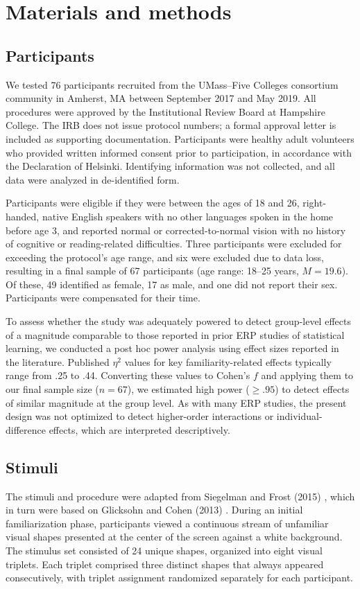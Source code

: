 \section*{Materials and methods}

\subsection*{Participants}
We tested 76 participants recruited from the UMass–Five Colleges consortium community in Amherst, MA between September 2017 and May 2019. All procedures were approved by the Institutional Review Board at Hampshire College. The IRB does not issue protocol numbers; a formal approval letter is included as supporting documentation. Participants were healthy adult volunteers who provided written informed consent prior to participation, in accordance with the Declaration of Helsinki. Identifying information was not collected, and all data were analyzed in de-identified form.

Participants were eligible if they were between the ages of 18 and 26, right-handed, native English speakers with no other languages spoken in the home before age 3, and reported normal or corrected-to-normal vision with no history of cognitive or reading-related difficulties. Three participants were excluded for exceeding the protocol’s age range, and six were excluded due to data loss, resulting in a final sample of 67 participants (age range: 18–25 years, $M = 19.6$). Of these, 49 identified as female, 17 as male, and one did not report their sex. Participants were compensated for their time.

To assess whether the study was adequately powered to detect group-level effects of a magnitude comparable to those reported in prior ERP studies of statistical learning, we conducted a post hoc power analysis using effect sizes reported in the literature. Published $\eta^2$ values for key familiarity-related effects typically range from .25 to .44. Converting these values to Cohen’s $f$ and applying them to our final sample size ($n = 67$), we estimated high power ($\geq .95$) to detect effects of similar magnitude at the group level. As with many ERP studies, the present design was not optimized to detect higher-order interactions or individual-difference effects, which are interpreted descriptively.

\subsection*{Stimuli}
The stimuli and procedure were adapted from Siegelman and Frost (2015) \cite{siegelmanStatisticalLearningIndividual2015}, which in turn were based on Glicksohn and Cohen (2013) \cite{glicksohnRoleCrossmodalAssociations2013}. During an initial familiarization phase, participants viewed a continuous stream of unfamiliar visual shapes presented at the center of the screen against a white background. The stimulus set consisted of 24 unique shapes, organized into eight visual triplets. Each triplet comprised three distinct shapes that always appeared consecutively, with triplet assignment randomized separately for each participant.

